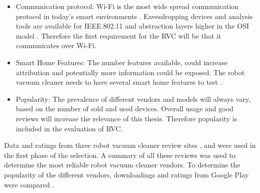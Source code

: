 \begin{itemize}
    \item Communication protocol: \gls{Wi-Fi} is the most wide spread communication protocol in today's smart environments \cite{robotsel1}. Eavesdropping devices and analysis tools are available for IEEE.802.11 and abstraction layers higher in the \gls{OSI} model \cite{osimodel}. Therefore the first requirement for the \gls{RVC} will be that it communicates over \gls{Wi-Fi}.
    
    \item Smart Home Features:  The number features available, could increase attribution and potentially more information could be exposed. The robot vacuum cleaner needs to have several smart home features to test \cite{robotsel4}.
    
    \item Popularity: The prevalence of different vendors and models will always vary, based on the number of sold and used devices. Overall usage and good reviews will increase the relevance of this thesis. Therefore popularity is included in the evaluation of \gls{RVC}.
\end{itemize}

Data and ratings from three robot vacuum cleaner review sites \cite{robotsel11}, \cite{robotsel12} and \cite{robotsel13} were used in the first phase of the selection. A summary of all these reviews was used to determine the most reliable robot vacuum cleaner vendors. To determine the popularity of the different vendors, downloadings and ratings from Google Play were compared \cite{GooglePlay}.

